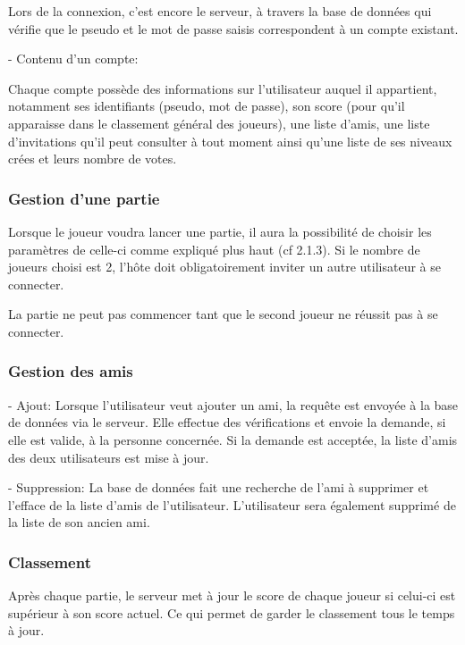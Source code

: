 \documentclass[a4paper,12pt]{article}
\begin{document}
Lors de la connexion, c'est encore le serveur, à travers la base de données qui vérifie que le pseudo et le mot de passe saisis correspondent à un compte existant.

- Contenu d'un compte:

Chaque compte possède des informations sur l'utilisateur auquel il appartient, notamment ses identifiants (pseudo, mot de passe), son score (pour qu'il apparaisse dans le classement général des joueurs), une liste d'amis, une liste d'invitations qu'il peut consulter à tout moment ainsi qu'une liste de ses niveaux crées et leurs nombre de votes.

\subsubsection{Gestion d'une partie}

Lorsque le joueur voudra lancer une partie,
il aura la possibilité de choisir les paramètres de celle-ci comme expliqué plus haut (cf 2.1.3). Si le nombre de joueurs choisi est 2, l'hôte doit obligatoirement inviter un autre utilisateur à se connecter.

La partie ne peut pas commencer tant que le second joueur ne réussit pas à se connecter.
\subsubsection{Gestion des amis}

- Ajout: Lorsque l'utilisateur veut ajouter un ami, la requête est envoyée à la base de données via le serveur. Elle effectue des vérifications et envoie la demande, si elle est valide, à la personne concernée. Si la demande est acceptée, la liste d'amis des deux utilisateurs est mise à jour.

- Suppression: La base de données fait une recherche de l'ami à supprimer et l'efface de la liste d'amis de l'utilisateur. L'utilisateur sera également supprimé de la liste de son ancien ami.

\subsubsection{Classement}

Après chaque partie, le serveur met à jour le score de chaque joueur si celui-ci est supérieur à son score actuel. 
Ce qui permet de garder le classement tous le temps à jour. 
\end{document}
